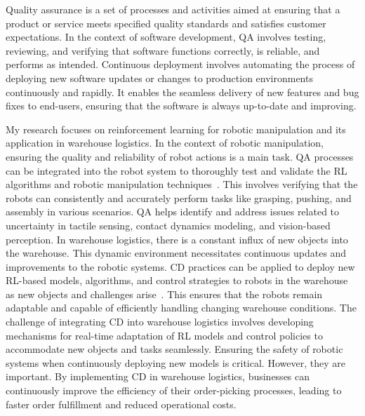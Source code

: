 \documentclass[11pt]{article}
\begin{document}

Quality assurance is a set of processes and activities aimed at ensuring that a product or service meets specified quality standards and satisfies customer expectations. In the context of software development, QA involves testing, reviewing, and verifying that software functions correctly, is reliable, and performs as intended. Continuous deployment involves automating the process of deploying new software updates or changes to production environments continuously and rapidly. It enables the seamless delivery of new features and bug fixes to end-users, ensuring that the software is always up-to-date and improving.

My research focuses on reinforcement learning for robotic manipulation and its application in warehouse logistics.
In the context of robotic manipulation, ensuring the quality and reliability of robot actions is a main task. QA processes can be integrated into the robot system to thoroughly test and validate the RL algorithms and robotic manipulation techniques~\cite{byambasuren2020application}. This involves verifying that the robots can consistently and accurately perform tasks like grasping, pushing, and assembly in various scenarios. QA helps identify and address issues related to uncertainty in tactile sensing, contact dynamics modeling, and vision-based perception.
In warehouse logistics, there is a constant influx of new objects into the warehouse. This dynamic environment necessitates continuous updates and improvements to the robotic systems. CD practices can be applied to deploy new RL-based models, algorithms, and control strategies to robots in the warehouse as new objects and challenges arise~\cite{scher2020warehouse}. This ensures that the robots remain adaptable and capable of efficiently handling changing warehouse conditions.
The challenge of integrating CD into warehouse logistics involves developing mechanisms for real-time adaptation of RL models and control policies to accommodate new objects and tasks seamlessly. Ensuring the safety of robotic systems when continuously deploying new models is critical. However, they are important. By implementing CD in warehouse logistics, businesses can continuously improve the efficiency of their order-picking processes, leading to faster order fulfillment and reduced operational costs.
\end{document}
